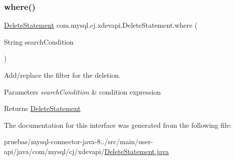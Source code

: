 \subsubsection{\texorpdfstring{where()}{where()}}
{\footnotesize\ttfamily \mbox{\hyperlink{interfacecom_1_1mysql_1_1cj_1_1xdevapi_1_1_delete_statement}{Delete\+Statement}} com.\+mysql.\+cj.\+xdevapi.\+Delete\+Statement.\+where (\begin{DoxyParamCaption}\item[{String}]{search\+Condition }\end{DoxyParamCaption})}

Add/replace the filter for the deletion.


\begin{DoxyParams}{Parameters}
{\em search\+Condition} & condition expression \\
\hline
\end{DoxyParams}
\begin{DoxyReturn}{Returns}
\mbox{\hyperlink{interfacecom_1_1mysql_1_1cj_1_1xdevapi_1_1_delete_statement}{Delete\+Statement}} 
\end{DoxyReturn}


The documentation for this interface was generated from the following file\+:\begin{DoxyCompactItemize}
\item 
pruebas/mysql-\/connector-\/java-\/8../src/main/user-\/api/java/com/mysql/cj/xdevapi/\mbox{\hyperlink{_delete_statement_8java}{Delete\+Statement.\+java}}\end{DoxyCompactItemize}
